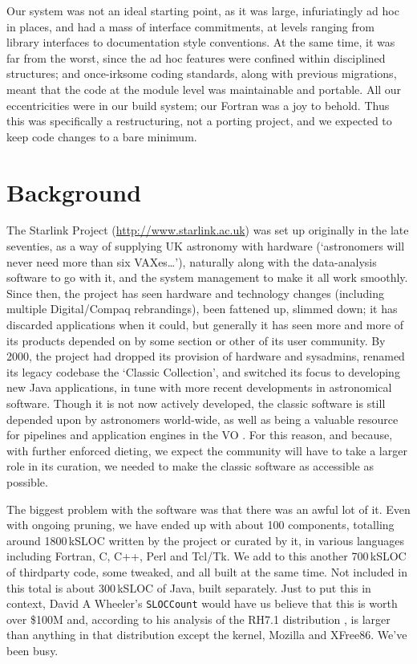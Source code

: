 \documentclass{speauth}
\begin{document}
Our system was not an ideal starting point, as it was large,
infuriatingly ad hoc in places, and had a mass of interface
commitments, at levels ranging from library interfaces to
documentation style conventions.  At the same time, it was far from
the worst, since the ad hoc features were confined within disciplined
structures; and once-irksome coding standards, along with previous
migrations, meant that the code at the module level was maintainable
and portable.  All our eccentricities were in our build system; our
Fortran was a joy to behold.  Thus this was specifically a
restructuring, not a porting project, and we expected to keep code
changes to a bare minimum.


\section{Background}
\label{s:background}


The Starlink Project (\url{http://www.starlink.ac.uk}) was set up
originally in the late seventies, as a way of supplying UK astronomy
with hardware (`astronomers will never need more than six
VAXes\dots'), naturally along with the data-analysis software to go
with it, and the system management to make it all work smoothly.
Since then, the project has seen hardware and technology changes
(including multiple Digital/Compaq rebrandings), been fattened up,
slimmed down; it has discarded applications when it could, but
generally it has seen more and more of its products depended on by
some section or other of its user community.  By 2000, the project had
dropped its provision of hardware and sysadmins, renamed its legacy
codebase the `Classic Collection', and switched its focus to
developing new Java applications, in tune with more recent
developments in astronomical software.  Though it is not now actively
developed, the classic software is still depended upon by astronomers
world-wide, as well as being a valuable resource for pipelines
\cite{cavanagh03,currie04} and application engines in the VO
\cite{giaretta05}.  For this reason, and because, with further
enforced dieting, we expect the community will have to take a larger
role in its curation, we needed to make the classic software as
accessible as possible.

The biggest problem with the software was that there was an awful lot
of it.  Even with ongoing pruning, we have ended up with about 100
components, totalling around 1800\,kSLOC written by the project or
curated by it, in various languages
including Fortran, C, C++, Perl and Tcl/Tk.  We add to this another
700\,kSLOC of thirdparty code, some tweaked, and all built at the same
time.  Not included in this total is about 300\,kSLOC of Java,
built separately.  Just to put this in context, David A
Wheeler's \texttt{SLOCCount} would have us believe that this is worth
over \$100M and, according to his analysis of the RH7.1 distribution
\cite{wheeler02}, is larger than anything in
that distribution except the kernel, Mozilla and XFree86.  We've been busy.
\end{document}
